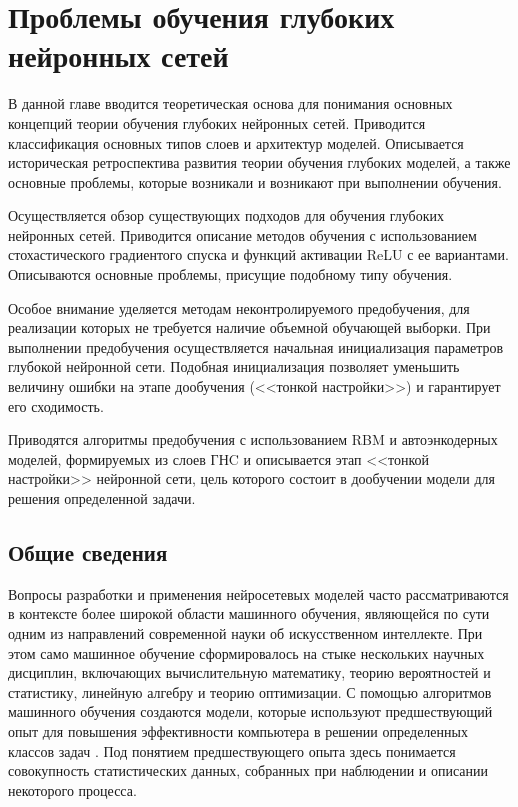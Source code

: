 \chapter{Проблемы обучения глубоких нейронных сетей}

В данной главе вводится теоретическая основа для понимания основных концепций теории обучения глубоких нейронных сетей. Приводится классификация основных типов слоев и архитектур моделей. Описывается историческая ретроспектива развития теории обучения глубоких моделей, а также основные проблемы, которые возникали и возникают при выполнении обучения. 

Осуществляется обзор существующих подходов для обучения глубоких нейронных сетей. Приводится описание методов обучения с использованием стохастического градиентого спуска и функций активации ReLU с ее вариантами. Описываются основные проблемы, присущие подобному типу обучения.

Особое внимание уделяется методам неконтролируемого предобучения, для реализации которых не требуется наличие объемной обучающей выборки. При выполнении предобучения осуществляется начальная инициализация параметров глубокой нейронной сети. Подобная инициализация позволяет уменьшить величину ошибки на этапе дообучения (<<тонкой настройки>>) и гарантирует его сходимость.

Приводятся алгоритмы предобучения с использованием RBM и автоэнкодерных моделей, формируемых из слоев ГНC и описывается этап <<тонкой настройки>> нейронной сети, цель которого состоит в дообучении модели для решения определенной задачи.

\section{Общие сведения}

Вопросы разработки и применения нейросетевых моделей часто рассматриваются в контексте более широкой области машинного обучения, являющейся по сути одним из направлений современной науки об искусственном интеллекте. При этом само машинное обучение сформировалось на стыке нескольких научных дисциплин, включающих вычислительную математику, теорию вероятностей и статистику, линейную алгебру и теорию оптимизации. С помощью алгоритмов машинного обучения создаются модели, которые используют предшествующий опыт для повышения эффективности компьютера в решении определенных классов задач \cite[c.~2]{mitchell1997machine}. Под понятием предшествующего опыта здесь понимается совокупность статистических данных, собранных при наблюдении и описании некоторого процесса. 

